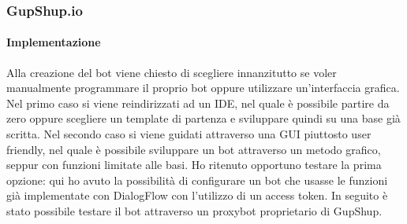 \documentclass[]{article}
\begin{document}
\subsubsection{GupShup.io}
\paragraph{Implementazione}
Alla creazione del bot viene chiesto di scegliere innanzitutto se voler manualmente programmare il proprio bot oppure utilizzare un’interfaccia grafica. Nel primo caso si viene reindirizzati ad un IDE, nel quale è possibile partire da zero oppure scegliere un template di partenza e sviluppare quindi su una base già scritta. Nel secondo caso si viene guidati attraverso una GUI piuttosto user friendly, nel quale è possibile sviluppare un bot attraverso un metodo grafico, seppur con funzioni limitate alle basi. Ho ritenuto opportuno testare la prima opzione: qui ho avuto la possibilità di configurare un bot che usasse le funzioni già implementate con DialogFlow con l’utilizzo di un access token. In seguito è stato possibile testare il bot attraverso un proxybot proprietario di GupShup. 
\end{document}
